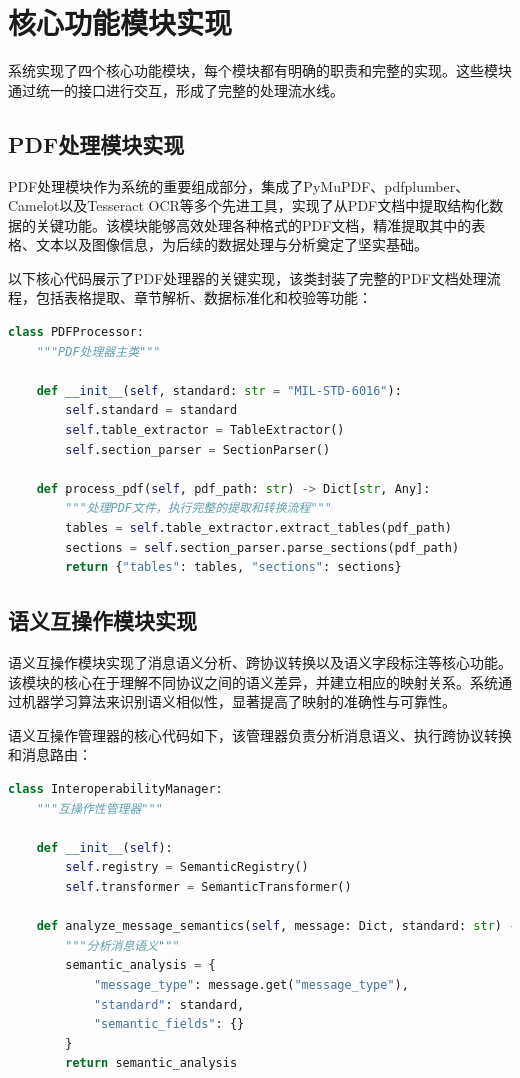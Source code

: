 \section{核心功能模块实现}

系统实现了四个核心功能模块，每个模块都有明确的职责和完整的实现。这些模块通过统一的接口进行交互，形成了完整的处理流水线。

\subsection{PDF处理模块实现}

PDF处理模块作为系统的重要组成部分，集成了PyMuPDF、pdfplumber、Camelot以及Tesseract OCR等多个先进工具，实现了从PDF文档中提取结构化数据的关键功能。该模块能够高效处理各种格式的PDF文档，精准提取其中的表格、文本以及图像信息，为后续的数据处理与分析奠定了坚实基础。

以下核心代码展示了PDF处理器的关键实现，该类封装了完整的PDF文档处理流程，包括表格提取、章节解析、数据标准化和校验等功能：

\begin{lstlisting}[language=Python, label=fig:pdf_processor]
class PDFProcessor:
    """PDF处理器主类"""
    
    def __init__(self, standard: str = "MIL-STD-6016"):
        self.standard = standard
        self.table_extractor = TableExtractor()
        self.section_parser = SectionParser()
    
    def process_pdf(self, pdf_path: str) -> Dict[str, Any]:
        """处理PDF文件，执行完整的提取和转换流程"""
        tables = self.table_extractor.extract_tables(pdf_path)
        sections = self.section_parser.parse_sections(pdf_path)
        return {"tables": tables, "sections": sections}
\end{lstlisting}

\subsection{语义互操作模块实现}

语义互操作模块实现了消息语义分析、跨协议转换以及语义字段标注等核心功能。该模块的核心在于理解不同协议之间的语义差异，并建立相应的映射关系。系统通过机器学习算法来识别语义相似性，显著提高了映射的准确性与可靠性。

语义互操作管理器的核心代码如下，该管理器负责分析消息语义、执行跨协议转换和消息路由：

\begin{lstlisting}[language=Python, label=fig:semantic_interop]
class InteroperabilityManager:
    """互操作性管理器"""
    
    def __init__(self):
        self.registry = SemanticRegistry()
        self.transformer = SemanticTransformer()
    
    def analyze_message_semantics(self, message: Dict, standard: str) -> Dict:
        """分析消息语义"""
        semantic_analysis = {
            "message_type": message.get("message_type"),
            "standard": standard,
            "semantic_fields": {}
        }
        return semantic_analysis
\end{lstlisting}

